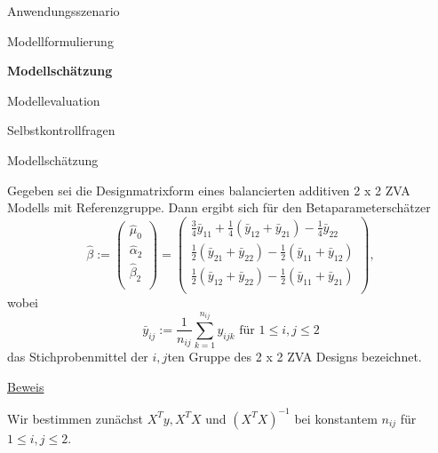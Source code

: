 \documentclass[
  8pt,
  ignorenonframetext,
]{beamer}
\begin{document}
\begin{frame}{}
\protect\hypertarget{section-6}{}
\large
{}
\vfill

Anwendungsszenario

Modellformulierung

\textbf{Modellschätzung}

Modellevaluation

Selbstkontrollfragen \vfill
\end{frame}

\begin{frame}{Modellschätzung}
\protect\hypertarget{modellschuxe4tzung}{}
\footnotesize
\begin{theorem}
\justifying
\normalfont
Gegeben sei die Designmatrixform eines balancierten additiven 2 x 2 ZVA Modells mit
Referenzgruppe. Dann ergibt sich für den Betaparameterschätzer
\begin{equation}
\hat{\beta} :=
\begin{pmatrix}
\hat{\mu}_0       \\
\hat{\alpha}_2    \\
\hat{\beta}_2     \\
\end{pmatrix}
=
\begin{pmatrix}
\frac{3}{4}\bar{y}_{11} + \frac{1}{4}(\bar{y}_{12} + \bar{y}_{21}) - \frac{1}{4}\bar{y}_{22} \\
\frac{1}{2}(\bar{y}_{21} + \bar{y}_{22}) - \frac{1}{2}(\bar{y}_{11} + \bar{y}_{12})           \\
\frac{1}{2}(\bar{y}_{12} + \bar{y}_{22}) - \frac{1}{2}(\bar{y}_{11} + \bar{y}_{21})           \\
\end{pmatrix},
\end{equation}
wobei
\begin{equation}
\bar{y}_{ij} := \frac{1}{n_{ij}}\sum_{k = 1}^{n_{ij}} y_{ijk} \mbox{ für } 1 \le i,j \le 2
\end{equation}
das Stichprobenmittel der $i,j$ten Gruppe des 2 x 2 ZVA Designs bezeichnet.
\end{theorem}

\footnotesize

\underline{Beweis}

Wir bestimmen zunächst \(X^Ty, X^TX\) und \((X^TX)^{-1}\) bei konstantem
\(n_{ij}\) für \(1 \le i,j \le 2\).
\end{frame}
\end{document}
